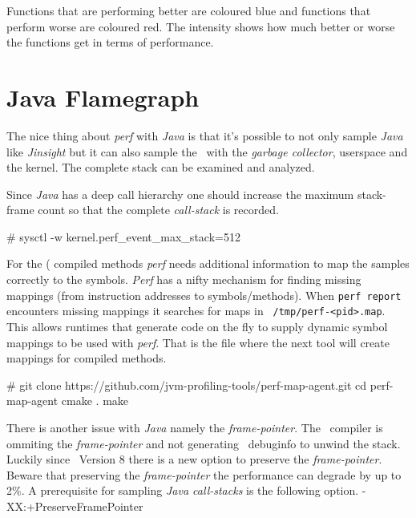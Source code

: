 {{
  {
    {}
  \stopcombination}

Functions that are performing better are coloured blue and functions that
perform worse are coloured red. The intensity shows how much better or worse
the functions get in terms of performance.

\section{Java Flamegraph}

The nice thing about {\em perf} with {\em Java} is that it's possible
to not only sample {\em Java} like {\em Jinsight} but it can also
sample the \JVM\ with the {\em garbage collector}, userspace and the
kernel. The complete stack can be examined and analyzed.

Since {\em Java} has a deep call hierarchy one should increase the
maximum stack-frame count so that the complete {\em call-stack} is
recorded.

\starttyping
# sysctl -w kernel.perf_event_max_stack=512
\stoptyping

For the  (\JIT\) compiled methods {\em perf} needs
additional information to map the samples correctly to the
symbols. {\em Perf} has a nifty mechanism for finding missing mappings
(from instruction addresses to symbols/methods). When {\tt perf
  report} encounters missing mappings it searches for maps in {\tt
  /tmp/perf-<pid>.map}. This allows runtimes that generate code on the
fly to supply dynamic symbol mappings to be used with {\em perf}.
That is the file where the next tool will create mappings for
\JIT\-compiled methods.

\starttyping
# git clone  https://github.com/jvm-profiling-tools/perf-map-agent.git
cd perf-map-agent
cmake .
make
\stoptyping

There is another issue with {\em Java} namely the {\em frame-pointer}.
The \JVM\ compiler is ommiting the {\em frame-pointer} and not generating
\DWARF\ debuginfo to unwind the stack. Luckily since \JDK\ Version 8 there
is a new option to preserve the {\em frame-pointer}. Beware that preserving
the {\em frame-pointer} the performance can degrade by up to 2\%. A prerequisite
for sampling {\em Java call-stacks} is the following option.
\starttyping
-XX:+PreserveFramePointer
\stoptyping

}}
